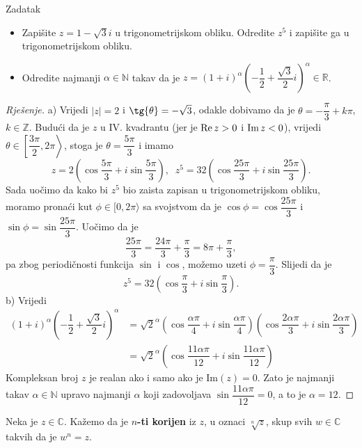 \begin{exercise}{Zadatak} \textbf{}
\begin{itemize}
\item[a)] Zapišite \(z=1-\sqrt{3}i\) u trigonometrijskom obliku. Odredite \(z^5\) i zapišite ga u trigonometrijskom obliku.
\item[b)] Odredite najmanji \(\alpha\in \mathbb{N}\) takav da je \(z=\left(1+i\right)^{\alpha}\left(-\dfrac{1}{2}+\dfrac{\sqrt{3}}{2}i\right)^{\alpha}\in \mathbb{R}\).
\end{itemize}
\end{exercise}
\begin{proof}[Rješenje]
a) Vrijedi $\lvert z\rvert=2$ i $\tg{\theta}=-\sqrt{3}$, odakle dobivamo da je $\theta=-\dfrac{\pi}{3}+k\pi$, $k\in \mathbb{Z}$. Budući da je $z$ u IV. kvadrantu (jer je $\operatorname{Re}{z}>0$ i $\operatorname{Im}{z}<0$), vrijedi $\theta\in \left[\dfrac{3\pi}{2}, 2\pi\right\rangle$, stoga je $\theta=\dfrac{5\pi}{3}$ i imamo 
\[z=2\left(\cos{\dfrac{5\pi}{3}}+i\sin{\dfrac{5\pi}{3}}\right),\;\; z^5=32\left(\cos{\dfrac{25\pi}{3}}+i\sin{\dfrac{25\pi}{3}}\right).\]
Sada uočimo da kako bi $z^5$ bio zaista zapisan u trigonometrijskom obliku, moramo pronaći kut $\phi\in [0, 2\pi\rangle$ sa svojstvom da je $\cos{\phi}=\cos{\dfrac{25\pi}{3}}$ i $\sin{\phi}=\sin{\dfrac{25\pi}{3}}$. Uočimo da je
$$\dfrac{25\pi}{3}=\dfrac{24\pi}{3}+\dfrac{\pi}{3}=8\pi+\dfrac{\pi}{3},$$
pa zbog periodičnosti funkcija $\sin$ i $\cos$, možemo uzeti $\phi=\dfrac{\pi}{3}$. Slijedi da je 
\[z^5=32\left(\cos{\dfrac{\pi}{3}}+i\sin{\dfrac{\pi}{3}}\right).\]
b) Vrijedi 
\begin{align*}
\left(1+i\right)^{\alpha}\left(-\dfrac{1}{2}+\dfrac{\sqrt{3}}{2}i\right)^{\alpha}&=\sqrt{2}^{\alpha}\left(\cos{\dfrac{\alpha \pi}{4}}+i\sin{\dfrac{\alpha \pi}{4}}\right)\left(\cos{\dfrac{2\alpha \pi}{3}}+i\sin{\dfrac{2\alpha \pi}{3}}\right)\\
&=\sqrt{2}^{\alpha}\left(\cos{\dfrac{11\alpha \pi}{12}}+i\sin{\dfrac{11\alpha \pi}{12}}\right)
\end{align*}
Kompleksan broj \(z\) je realan ako i samo ako je \(\mathrm{Im}(z)=0\). Zato je najmanji takav \(\alpha\in \mathbb{N}\) upravo najmanji \(\alpha\) koji zadovoljava \(\sin{\dfrac{11\alpha \pi}{12}}=0\), a to je \(\alpha=12\).
\end{proof}
\begin{definition}
Neka je \(z\in \mathbb{C}\). Kažemo da je \textbf{\(n\)-ti korijen} iz \(z\), u oznaci \(\sqrt[n]{z}\), skup svih \(w\in \mathbb{C}\) takvih da je \(w^n=z\).
\end{definition}

